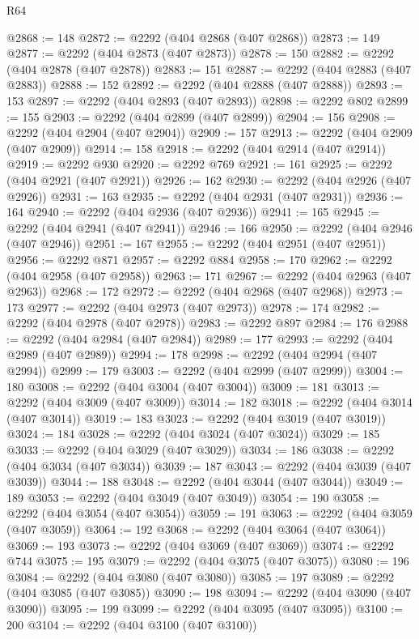 \begin{lexlean}{R64}
\begin{coremodule}
@2868 := 148
@2872 := @2292 (@404 @2868 (@407 @2868))
@2873 := 149
@2877 := @2292 (@404 @2873 (@407 @2873))
@2878 := 150
@2882 := @2292 (@404 @2878 (@407 @2878))
@2883 := 151
@2887 := @2292 (@404 @2883 (@407 @2883))
@2888 := 152
@2892 := @2292 (@404 @2888 (@407 @2888))
@2893 := 153
@2897 := @2292 (@404 @2893 (@407 @2893))
@2898 := @2292 @802
@2899 := 155
@2903 := @2292 (@404 @2899 (@407 @2899))
@2904 := 156
@2908 := @2292 (@404 @2904 (@407 @2904))
@2909 := 157
@2913 := @2292 (@404 @2909 (@407 @2909))
@2914 := 158
@2918 := @2292 (@404 @2914 (@407 @2914))
@2919 := @2292 @930
@2920 := @2292 @769
@2921 := 161
@2925 := @2292 (@404 @2921 (@407 @2921))
@2926 := 162
@2930 := @2292 (@404 @2926 (@407 @2926))
@2931 := 163
@2935 := @2292 (@404 @2931 (@407 @2931))
@2936 := 164
@2940 := @2292 (@404 @2936 (@407 @2936))
@2941 := 165
@2945 := @2292 (@404 @2941 (@407 @2941))
@2946 := 166
@2950 := @2292 (@404 @2946 (@407 @2946))
@2951 := 167
@2955 := @2292 (@404 @2951 (@407 @2951))
@2956 := @2292 @871
@2957 := @2292 @884
@2958 := 170
@2962 := @2292 (@404 @2958 (@407 @2958))
@2963 := 171
@2967 := @2292 (@404 @2963 (@407 @2963))
@2968 := 172
@2972 := @2292 (@404 @2968 (@407 @2968))
@2973 := 173
@2977 := @2292 (@404 @2973 (@407 @2973))
@2978 := 174
@2982 := @2292 (@404 @2978 (@407 @2978))
@2983 := @2292 @897
@2984 := 176
@2988 := @2292 (@404 @2984 (@407 @2984))
@2989 := 177
@2993 := @2292 (@404 @2989 (@407 @2989))
@2994 := 178
@2998 := @2292 (@404 @2994 (@407 @2994))
@2999 := 179
@3003 := @2292 (@404 @2999 (@407 @2999))
@3004 := 180
@3008 := @2292 (@404 @3004 (@407 @3004))
@3009 := 181
@3013 := @2292 (@404 @3009 (@407 @3009))
@3014 := 182
@3018 := @2292 (@404 @3014 (@407 @3014))
@3019 := 183
@3023 := @2292 (@404 @3019 (@407 @3019))
@3024 := 184
@3028 := @2292 (@404 @3024 (@407 @3024))
@3029 := 185
@3033 := @2292 (@404 @3029 (@407 @3029))
@3034 := 186
@3038 := @2292 (@404 @3034 (@407 @3034))
@3039 := 187
@3043 := @2292 (@404 @3039 (@407 @3039))
@3044 := 188
@3048 := @2292 (@404 @3044 (@407 @3044))
@3049 := 189
@3053 := @2292 (@404 @3049 (@407 @3049))
@3054 := 190
@3058 := @2292 (@404 @3054 (@407 @3054))
@3059 := 191
@3063 := @2292 (@404 @3059 (@407 @3059))
@3064 := 192
@3068 := @2292 (@404 @3064 (@407 @3064))
@3069 := 193
@3073 := @2292 (@404 @3069 (@407 @3069))
@3074 := @2292 @744
@3075 := 195
@3079 := @2292 (@404 @3075 (@407 @3075))
@3080 := 196
@3084 := @2292 (@404 @3080 (@407 @3080))
@3085 := 197
@3089 := @2292 (@404 @3085 (@407 @3085))
@3090 := 198
@3094 := @2292 (@404 @3090 (@407 @3090))
@3095 := 199
@3099 := @2292 (@404 @3095 (@407 @3095))
@3100 := 200
@3104 := @2292 (@404 @3100 (@407 @3100))

\end{coremodule}
\end{lexlean}
